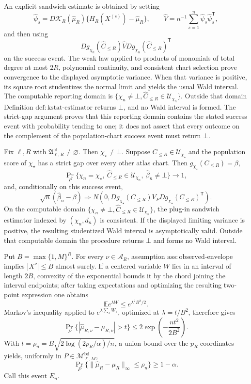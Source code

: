 An explicit sandwich estimate is obtained by setting
\[
 \widehat\psi_s=D\mathcal K_R(\widehat\mu_R)
 \{H_R(X^{(s)})-\widehat\mu_R\},
 \qquad
 \widehat V=n^{-1}\sum_{s=1}^n\widehat\psi_s\widehat\psi_s^{\mathsf T},
\]
and then using
\[
 Dg_{\chi_n}(\widehat C_{\le R})\widehat V
 Dg_{\chi_n}(\widehat C_{\le R})^{\mathsf T}
\]
on the success event.  The weak law applied to products of monomials of total degree at most \(2R\), polynomial continuity, and consistent chart selection prove convergence to the displayed asymptotic variance.  When that variance is positive, its square root studentizes the normal limit and yields the usual Wald interval.  The computable reporting domain is \(\{\chi_n\ne\bot,\widehat C_{\le R}\in\mathcal U_{\chi_n}\}\).  Outside that domain Definition \(\mathrm{def:kstat\mbox{-}estimator}\) returns \(\bot\), and no Wald interval is formed.  The strict-gap argument proves that this reporting domain contains the stated success event with probability tending to one; it does not assert that every outcome on the complement of the population-chart success event must return \(\bot\).

Fix \(\ell,R\) with \(\mathfrak A^{\mathrm{id}}_{\ell,R}\ne\varnothing\).  Then \(\chi_\star\ne\bot\).  Suppose \(C_{\le R}\in\mathcal U_{\chi_\star}\) and the population score of \(\chi_\star\) has a strict gap over every other atlas chart.  Then \(g_{\chi_\star}(C_{\le R})=\beta\),
\[
 \Pr_P\{\chi_n=\chi_\star,\ \widehat C_{\le R}\in\mathcal U_{\chi_n},\ \widehat\beta_n\ne\bot\}\longrightarrow1,
\]
and, conditionally on this success event,
\[
 \sqrt n(\widehat\beta_n-\beta)\Rightarrow
 N\!\left(0,Dg_{\chi_\star}(C_{\le R})V_PDg_{\chi_\star}(C_{\le R})^{\mathsf T}\right).
\]
On the computable domain \(\{\chi_n\ne\bot,\widehat C_{\le R}\in\mathcal U_{\chi_n}\}\), the plug-in sandwich estimator indexed by \((\chi_n,d_n)\) is consistent.  If the displayed limiting variance is positive, the resulting studentized Wald interval is asymptotically valid.  Outside that computable domain the procedure returns \(\bot\) and forms no Wald interval.

Put \(B=\max\{1,M\}^R\).  For every \(\nu\in\mathcal A_R\), assumption \(\mathrm{ass:observed\mbox{-}envelope}\) implies \(|X^\nu|\le B\) almost surely.  If a centered variable \(W\) lies in an interval of length \(2B\), convexity of the exponential bounds it by the chord joining the interval endpoints; after taking expectations and optimizing the resulting two-point expression one obtains
\[
 \mathbb E e^{\lambda W}\le e^{\lambda^2B^2/2}.
\]
Markov's inequality applied to \(e^{\lambda\sum_sW_s}\), optimized at \(\lambda=t/B^2\), therefore gives
\[
 \Pr_P\{|\widehat\mu_{R,\nu}-\mu_{R,\nu}|>t\}
 \le2\exp\!\left(-\frac{nt^2}{2B^2}\right).
\]
With \(t=\rho_n=B\sqrt{2\log(2p_R/\alpha)/n}\), a union bound over the \(p_R\) coordinates yields, uniformly in \(P\in\mathcal M^{\mathrm{bd}}_{\ell,M}\),
\[
 \Pr_P\{\|\widehat\mu_R-\mu_R\|_\infty\le\rho_n\}\ge1-\alpha.
\]
Call this event \(E_n\).

